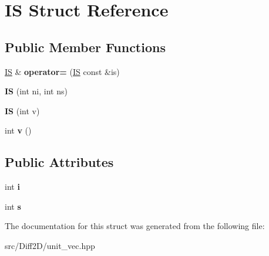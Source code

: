 \hypertarget{structIS}{\section{I\-S Struct Reference}
\label{structIS}
}
\subsection*{Public Member Functions}
\begin{DoxyCompactItemize}
\item 
\hypertarget{structIS_aec66c50fd699031a1f617117c67eda11}{\hyperlink{structIS}{I\-S} \& {\bfseries operator=} (\hyperlink{structIS}{I\-S} const \&is)}\label{structIS_aec66c50fd699031a1f617117c67eda11}

\item 
\hypertarget{structIS_a2cb6d148c70406c11b9508be2cfddd7e}{{\bfseries I\-S} (int ni, int ns)}\label{structIS_a2cb6d148c70406c11b9508be2cfddd7e}

\item 
\hypertarget{structIS_a53883df04399eab305d240898e889271}{{\bfseries I\-S} (int v)}\label{structIS_a53883df04399eab305d240898e889271}

\item 
\hypertarget{structIS_ad474289c5f0f5f5b231cd2067547cc0f}{int {\bfseries v} ()}\label{structIS_ad474289c5f0f5f5b231cd2067547cc0f}

\end{DoxyCompactItemize}
\subsection*{Public Attributes}
\begin{DoxyCompactItemize}
\item 
\hypertarget{structIS_ac0a890989ec0d04b8db157583b154c17}{int {\bfseries i}}\label{structIS_ac0a890989ec0d04b8db157583b154c17}

\item 
\hypertarget{structIS_a3a4dc37a5dc69fa81e33c5e7115dca71}{int {\bfseries s}}\label{structIS_a3a4dc37a5dc69fa81e33c5e7115dca71}

\end{DoxyCompactItemize}


The documentation for this struct was generated from the following file\-:\begin{DoxyCompactItemize}
\item 
src/\-Diff2\-D/unit\-\_\-vec.\-hpp\end{DoxyCompactItemize}
